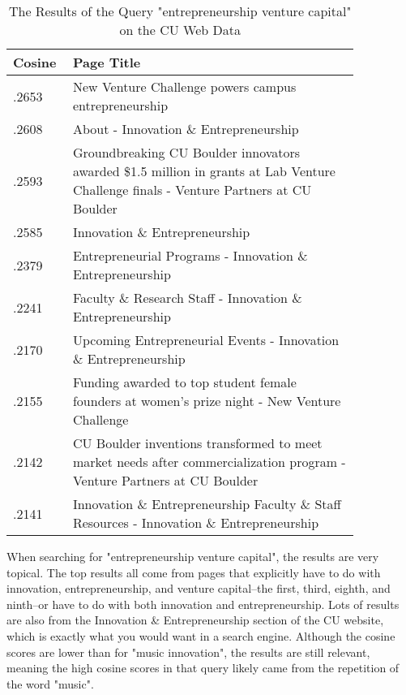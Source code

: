 \begin{table}[h]
\centering
\begin{tabular}{|p{0.1\linewidth} | p{0.75\linewidth}|}
\hline
\textbf{Cosine}  & \textbf{Page Title} \\ \hline
.2653        & New Venture Challenge powers campus entrepreneurship \\ \hline
.2608        & About - Innovation \& Entrepreneurship \\ \hline
.2593        & Groundbreaking CU Boulder innovators awarded \$1.5 million in grants at Lab Venture Challenge finals - Venture Partners at CU Boulder \\ \hline
.2585        & Innovation \& Entrepreneurship \\ \hline
.2379        & Entrepreneurial Programs - Innovation \& Entrepreneurship \\ \hline
.2241        & Faculty \& Research Staff - Innovation \& Entrepreneurship \\ \hline
.2170        & Upcoming Entrepreneurial Events - Innovation \& Entrepreneurship \\ \hline
.2155        & Funding awarded to top student female founders at women's prize night - New Venture Challenge \\ \hline
.2142        & CU Boulder inventions transformed to meet market needs after commercialization program - Venture Partners at CU Boulder \\ \hline
.2141        & Innovation \& Entrepreneurship Faculty \& Staff Resources - Innovation \& Entrepreneurship \\ \hline
\end{tabular}
\caption{The Results of the Query "entrepreneurship venture capital" on the CU Web Data}
\label{table:queryentrepreneurship}
\end{table}


When searching for "entrepreneurship venture capital", the results are very topical. The top results all come from pages that explicitly have to do with innovation, entrepreneurship, and venture capital--the first, third, eighth, and ninth--or have to do with both innovation and entrepreneurship. Lots of results are also from the Innovation \& Entrepreneurship section of the CU website, which is exactly what you would want in a search engine. Although the cosine scores are lower than for "music innovation", the results are still relevant, meaning the high cosine scores in that query likely came from the repetition of the word "music".

